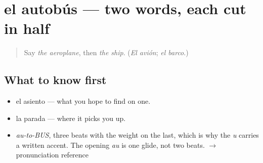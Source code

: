 \section[el autobús]{el autobús — two words, each cut in half}

\label{lesson:ES-C363-autobus}



\begin{quote}
Say \emph{the aeroplane}, then \emph{the ship}. (\emph{El avión}; \emph{el barco}.)
\end{quote}

\subsection*{What to know first}
\begin{itemize}
\raggedright
  \item el asiento — what you hope to find on one.
  \item la parada — where it picks you up.
\end{itemize}

\begin{sounds}
\begin{itemize}
\raggedright
  \item \emph{au-to-BUS}, three beats with the weight on the last, which is why the \emph{u} carries a written accent. The opening \emph{au} is one glide, not two beats. $\to$ pronunciation reference
\end{itemize}
\end{sounds}

